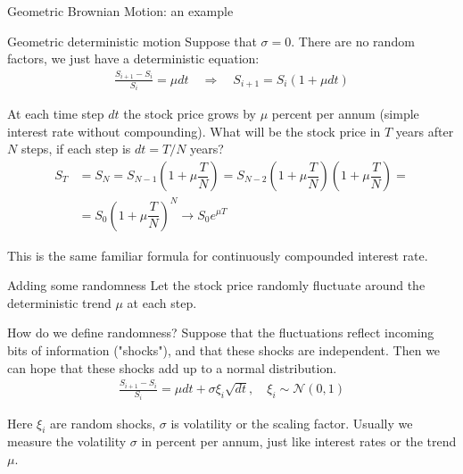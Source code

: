 \documentclass{beamer}
\begin{document}
\begin{frame}{Geometric Brownian Motion: an example}
\centering
{}
\end{frame}



\begin{frame}{Geometric deterministic motion}
\justify
Suppose that $\sigma=0$. There are no random factors, we just have a deterministic equation:
\begin{align*}
\frac{S_{i+1} - S_i}{S_i} = \mu dt \quad \Rightarrow \quad S_{i+1} = S_i(1 + \mu dt)
\end{align*}

\justify
At each time step $dt$ the stock price grows by $\mu$ percent per annum (simple interest rate without compounding). What will be the stock price in $T$ years after $N$ steps, if each step is $dt=T/N$ years?
\begin{align*}
S_T &= S_N = S_{N-1}\left(1+\mu\dfrac{T}{N}\right) 
= S_{N-2}\left(1+\mu\dfrac{T}{N}\right)\left(1+\mu\dfrac{T}{N}\right) = \\
&= S_0\left(1+\mu\dfrac{T}{N}\right)^N \to S_0e^{\mu T}
\end{align*}

\justify
This is the same familiar formula for continuously compounded interest rate.
\end{frame}



\begin{frame}{Adding some randomness}
\justify
Let the stock price randomly fluctuate  around the deterministic trend $\mu$ at each step.

\justify
How do we define randomness? Suppose that the fluctuations reflect incoming bits of information ("shocks"), and that these shocks are independent. Then we can hope that these shocks add up to a normal distribution.
 \begin{align*}
\frac{S_{i+1} - S_i}{S_i} = \mu dt + \sigma\xi_i\sqrt{dt}, \quad \xi_i \sim \mathcal{N}(0, 1)
\end{align*}

Here $\xi_i$ are random shocks, $\sigma$ is volatility or the scaling factor. Usually we measure the volatility $\sigma$ in percent per annum, just like interest rates or the trend $\mu$.
\end{frame}
\end{document}
